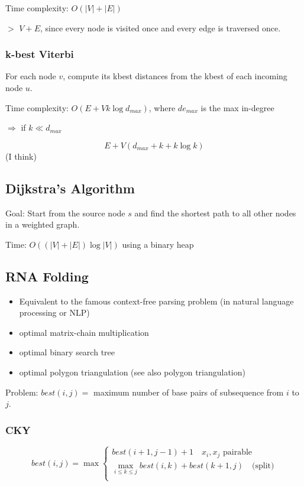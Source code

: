 \documentclass[12pt,a4paper]{article}
\newcommand{\remark}[1]{
    {\small $>$ {\color{blue} #1}}
}
\begin{document}
Time complexity: \(O(|V| + |E|)\)

\remark{$V + E$, since every node is visited once and every edge is traversed once.}

\subsubsection*{k-best Viterbi}

For each node $v$, compute its kbest distances from the kbest of each incoming node $u$.

Time complexity: \(O(E + Vk\log d_{max})\), where \(de_{max}\) is the max in-degree

\(\Rightarrow\) if \(k \ll d_{max}\)

\[E + V(d_{max} + k + k\log k)\] (I think)



\subsection*{Dijkstra's Algorithm}

Goal: Start from the source node \(s\) and find the shortest path to all other nodes in a weighted graph.

Time: \(O((|V| + |E|) \log |V|)\) using a binary heap

\subsection*{RNA Folding}

\begin{itemize}
    \item Equivalent to the famous context-free parsing problem (in natural language processing or NLP)
    \item optimal matrix-chain multiplication
    \item optimal binary search tree
    \item optimal polygon triangulation (see also polygon triangulation)
\end{itemize}

Problem: $best(i, j) = $ maximum number of base pairs of subsequence from $i$ to $j$.

\subsubsection*{CKY}

\[
best(i, j) = \max \left\{
\begin{array}{l}
    best(i + 1, j - 1) + 1 \quad \text{$x_i, x_j$ pairable} \\
    \max_{i \leq k \leq j} best(i, k) + best(k + 1, j) \quad \text{(split)} \\
\end{array}
\right.
\]
\end{document}
